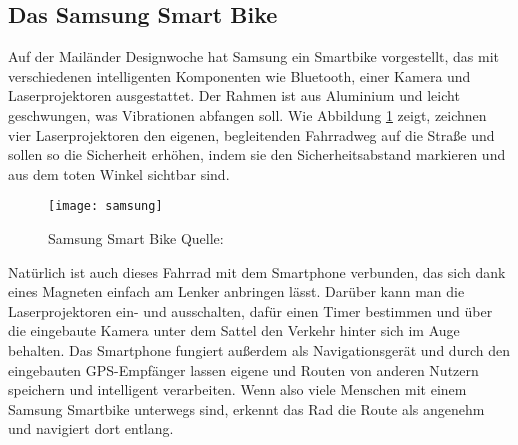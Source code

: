 \subsection{Das Samsung Smart Bike}
Auf der Mailänder Designwoche hat Samsung ein Smartbike vorgestellt, das mit verschiedenen intelligenten Komponenten wie Bluetooth, einer Kamera und Laserprojektoren ausgestattet. Der Rahmen ist aus Aluminium und leicht geschwungen, was Vibrationen abfangen soll. Wie Abbildung \ref{fig:samsung} zeigt, zeichnen vier Laserprojektoren den eigenen, begleitenden Fahrradweg auf die Straße und sollen so die Sicherheit erhöhen, indem sie den Sicherheitsabstand markieren und aus dem toten Winkel sichtbar sind. 
\begin{figure}[H]
    \centering
    \texttt{[image: samsung]}
    \caption[Samsung Smart Bike]{Samsung Smart Bike  Quelle: \cite{smartbike}} 
    \label{fig:samsung}
\end{figure}
Natürlich ist auch dieses Fahrrad mit dem Smartphone verbunden, das sich dank eines Magneten einfach am Lenker anbringen lässt. Darüber kann man die Laserprojektoren ein- und ausschalten, dafür einen Timer bestimmen und über die eingebaute Kamera unter dem Sattel den Verkehr hinter sich im Auge behalten. Das Smartphone fungiert außerdem als Navigationsgerät und durch den eingebauten \gls{GPS}-Empfänger lassen eigene und Routen von anderen Nutzern speichern und intelligent verarbeiten\cite{smartbike}. Wenn also viele Menschen mit einem Samsung Smartbike unterwegs sind, erkennt das Rad die Route als angenehm und navigiert dort entlang. 
